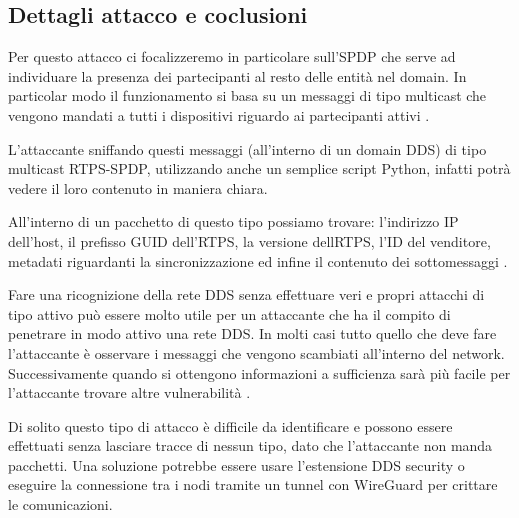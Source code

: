 \subsection{Dettagli attacco e coclusioni}
Per questo attacco ci focalizzeremo in particolare sull'SPDP che serve ad
individuare la presenza dei partecipanti al resto delle
entità nel domain. In particolar modo
il funzionamento si basa su un messaggi di tipo multicast che vengono
mandati a tutti i dispositivi riguardo ai partecipanti attivi
\cite{ddsrtps}.

L'attaccante sniffando questi messaggi (all'interno di un domain DDS)
di tipo multicast RTPS-SPDP,
utilizzando anche un semplice script Python, infatti potrà 
vedere il loro contenuto in maniera chiara.

All'interno di un pacchetto di questo tipo possiamo trovare:
l'indirizzo IP dell'host, il prefisso GUID dell'RTPS,
la versione dellRTPS, l'ID del venditore, metadati 
riguardanti la sincronizzazione
ed infine il contenuto dei sottomessaggi \cite{White2017AnII}.


Fare una ricognizione della rete DDS senza effettuare veri e propri
attacchi di tipo attivo può essere molto utile per un attaccante che 
ha il compito di penetrare in modo attivo
una rete DDS. In molti casi tutto quello che deve fare l'attaccante
è osservare i messaggi che vengono scambiati all'interno del network.
Successivamente quando si ottengono informazioni a sufficienza sarà più
facile per l'attaccante trovare altre vulnerabilità
\cite{White2017AnII}.

Di solito questo tipo di attacco è difficile da identificare e possono essere
effettuati senza lasciare tracce di nessun tipo, dato che l'attaccante non 
manda pacchetti.
Una soluzione potrebbe essere usare l'estensione DDS security o 
eseguire la connessione tra i nodi tramite un tunnel con WireGuard per crittare
le comunicazioni.






%     






